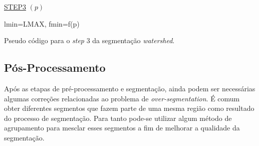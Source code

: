 \begin{algorithm}[H]
\SetAlgoLined


    \underline{STEP3} $(p)$\;
		
		lmin=LMAX, fmin=f(p)\\
    
    
 
 
\caption{Pseudo código para o \textit{step} 3 da segmentação \textit{watershed}.\cite{ruparelia2012implementation}}
\end{algorithm}




\subsection{Pós-Processamento}
Após as etapas de pré-processamento e segmentação, ainda podem ser necessárias algumas correções relacionadas ao problema de \textit{over-segmentation}. É comum obter diferentes segmentos que fazem parte de uma mesma região como resultado do processo de segmentação. Para tanto pode-se utilizar algum método de  agrupamento para mesclar esses segmentos a fim de melhorar a qualidade da segmentação.